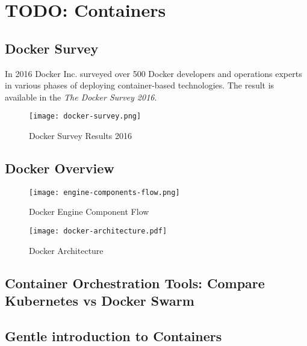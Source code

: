\chapter{TODO: Containers}\label{pi-cluster-form-factor}

\section{Docker Survey}

In 2016 Docker Inc. surveyed over 500 Docker developers and operations experts in various phases of deploying container-based technologies. The result is available in the {\em The Docker Survey 2016}. 


\begin{figure}[htb]
\centering
\texttt{[image: docker-survey.png]}
\caption{Docker Survey Results 2016
}
\end{figure}


\section{Docker Overview}



\begin{figure}[htb]
\centering
\texttt{[image: engine-components-flow.png]}
\caption{ Docker Engine Component Flow }
\end{figure}

\begin{figure}[htb]
\centering
\texttt{[image: docker-architecture.pdf]}
\caption{ Docker Architecture }
\end{figure}



\section{Container Orchestration Tools: Compare Kubernetes vs Docker Swarm}


\section{Gentle introduction to Containers}


